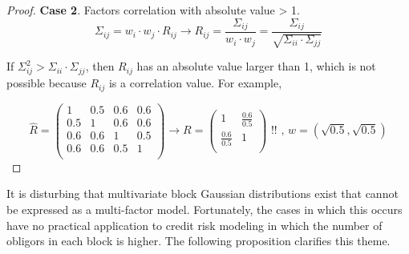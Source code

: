 \documentclass[11pt,fleqn]{book} %
\begin{document}
\begin{proof}
	\textbf{Case 2}. Factors correlation with absolute value > 1.
	\begin{displaymath}
		\Sigma_{ij} = w_i \cdot w_j \cdot R_{ij} \longrightarrow 
		R_{ij} = \frac{\Sigma_{ij}}{w_i \cdot w_j} = 
		\frac{\Sigma_{ij}}{\sqrt{\Sigma_{ii} \cdot \Sigma_{jj}}}
	\end{displaymath}
	\begin{adjustwidth}{1cm}{0pt}
		If $\Sigma_{ij}^2 > \Sigma_{ii} \cdot \Sigma_{jj}$, then $R_{ij}$ has an 
		absolute value larger than 1, which is not possible because $R_{ij}$ 
		is a correlation value. For example,
	\end{adjustwidth}
	\begin{displaymath}
		\widehat{R} = \left(
		\begin{array}{cc|cc}
			1   & 0.5 & 0.6 & 0.6 \\
			0.5 & 1   & 0.6 & 0.6 \\
			\hline
			0.6 & 0.6 & 1   & 0.5 \\
			0.6 & 0.6 & 0.5 & 1   \\
		\end{array}
		\right) 
		\longrightarrow
		R = \left(
		\begin{array}{cc}
			1               & \frac{0.6}{0.5} \\
			\frac{0.6}{0.5} & 1               \\
		\end{array}
		\right)
		\text{ !!}
		\text{ , }
		w = (\sqrt{0.5}, \sqrt{0.5})
	\end{displaymath}
\end{proof}

It is disturbing that multivariate block Gaussian distributions exist
that cannot be expressed as a multi-factor model. Fortunately, the 
cases in which this occurs have no practical application to credit risk
modeling in which the number of obligors in each block is higher. 
The following proposition clarifies this theme.
\end{document}
